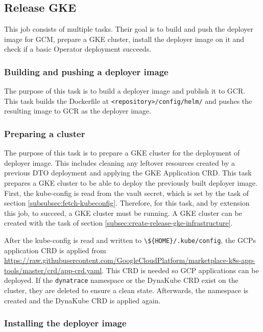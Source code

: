 \subsection{Release GKE}\label{subsec:release-gke}

This job consists of multiple tasks.
Their goal is to build and push the deployer image for GCM, prepare a GKE cluster, install the deployer image on it and check if a basic Operator deployment succeeds.

\subsubsection{Building and pushing a deployer image}\label{subsubsec:build-and-publish-deployer-image}

The purpose of this task is to build a deployer image and publish it to GCR.
This task builds the Dockerfile at \verb|<repository>/config/helm/| and pushes the resulting image to GCR as the deployer image.

\subsubsection{Preparing a cluster}\label{subsubsec:prepare-cluster}

The purpose of this task is to prepare a GKE cluster for the deployment of deployer image.
This includes cleaning any leftover resources created by a previous DTO deployment and applying the GKE Application CRD.
This task prepares a GKE cluster to be able to deploy the previously built deployer image.
First, the kube-config is read from the vault secret, which is set by the task of section \ref{subsubsec:fetch-kubeconfig}.
Therefore, for this task, and by extension this job, to succeed, a GKE cluster must be running.
A GKE cluster can be created with the task of section \ref{subsec:create-release-gke-infrastructure}.

After the kube-config is read and written to \verb|\${HOME}/.kube/config|, the GCPs application CRD is applied from \url{https://raw.githubusercontent.com/GoogleCloudPlatform/marketplace-k8s-app-tools/master/crd/app-crd.yaml}.
This CRD is needed so GCP applications can be deployed.
If the \verb|dynatrace| namespace or the DynaKube CRD exist on the cluster, they are deleted to ensure a clean state.
Afterwards, the namespace is created and the DynaKube CRD is applied again.

\subsubsection{Installing the deployer image}\label{subsubsec:install-deployer-image}

